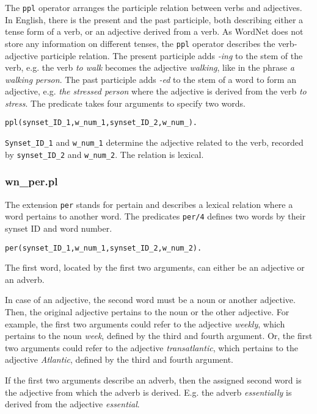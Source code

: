 \documentclass[12pt]{article}
\begin{document}
The {\tt ppl} operator arranges the participle relation between verbs and adjectives. In English, there is the present and the past
participle, both describing either a tense form of a verb, or an adjective derived from a verb.
As WordNet does not store any information on different tenses, the {\tt ppl} operator
describes the verb-adjective participle relation.
The present participle adds \emph{-ing} to the stem of the verb, e.g. the verb \emph{to walk} becomes the adjective \emph{walking}, like in
the phrase \emph{a walking person}. The past participle adds \emph{-ed} to the stem of a word to form an adjective, e.g.
\emph{the stressed person} where the adjective is derived from the verb \emph{to stress}.
The predicate takes four arguments to specify two words.
\begin{verbatim}
ppl(synset_ID_1,w_num_1,synset_ID_2,w_num_).
\end{verbatim}
{\tt Synset\_ID\_1} and {\tt w\_num\_1} determine the adjective related to the verb, recorded by {\tt synset\_ID\_2} and {\tt w\_num\_2}.
The relation is lexical.

\subsubsection{wn\_per.pl}

The extension {\tt per} stands for pertain and describes a lexical relation where a word pertains to another word.
The predicates {\tt per/4} defines two words by their synset ID and word number.
\begin{verbatim}
per(synset_ID_1,w_num_1,synset_ID_2,w_num_2).
\end{verbatim}
The first word, located by the first two arguments, can either be an adjective or an adverb.

In case of an adjective,
the second word must be a noun or another adjective. Then, the original adjective pertains
to the noun or the other adjective. For example, the first two arguments could refer to the adjective \emph{weekly}, which pertains
to the noun \emph{week}, defined by the third and fourth argument. Or, the first two arguments could refer to the
adjective \emph{transatlantic}, which pertains to the adjective \emph{Atlantic}, defined by the third and fourth argument.

If the first two arguments describe an adverb, then the assigned second word is the adjective from which the adverb is derived.
E.g. the adverb \emph{essentially} is derived from the adjective \emph{essential}.
\end{document}
